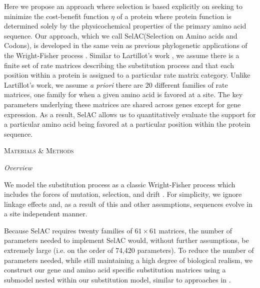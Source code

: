 \documentclass[12pt,letterpaper,fleqn]{article}
\renewcommand{\section}[1]{%
\bigskip
\begin{center}
\begin{Large}
\normalfont\scshape #1
\medskip
\end{Large}
\end{center}}
\renewcommand{\subsection}[1]{%
\bigskip
\begin{center}
\begin{large}
\normalfont\itshape #1
\end{large}
\end{center}}
\newcommand{\PC}{physicochemical\xspace}
\newcommand{\selac}{SelAC\xspace}
\begin{document}
Here we propose an approach where selection is based explicitly on seeking to minimize the cost-benefit function $\eta$ of a protein where protein function is determined solely by the \PC properties of the primary amino acid sequence.
Our approach, which we call \selac (Selection on Amino acids and Codons), is developed in the same vein as previous phylogenetic applications of the Wright-Fisher process \citep[e.g.~][]{MuseAndGaut1994,HalpernAndBruno1998,YangAndNielsen2008,RodrigueEtAl2005,KoshiAndGoldstein1997,KoshiEtAl1999,DimmicEtAl2000,ThorneEtAl2012,LartillotAndPhilippe2004,RodrigueAndLartillot2014}.
Similar to Lartillot's work \citep{LartillotAndPhilippe2004,RodrigueAndLartillot2014}, we assume there is a finite set of rate matrices describing the substitution process and that each position within a protein is assigned to a particular rate matrix category.
Unlike Lartillot's work, we assume \emph{a priori} there are 20 different families of rate matrices, one family for when a given amino acid is favored at a site.
The key parameters underlying these matrices are shared across genes except for gene expression.
As a result, \selac allows us to quantitatively evaluate the support for a particular amino acid being favored at a particular position within the protein sequence.

\section{Materials \& Methods}
\subsection{Overview}
We model the substitution process as a classic Wright-Fisher process which includes the forces of mutation, selection, and drift \citep{Fisher1930,Kimura1962,Wright1969,Iwasa1988,BergAndLassig2003,SellaAndHirsh2005,McCandlishAndStoltzfus2014}.
For simplicity, we ignore linkage effects and, as a result of this and other assumptions, sequences evolve in  a site independent manner.

Because \selac requires twenty families of $61 \times 61$ matrices, the number of parameters needed to implement \selac would, without further assumptions, be extremely large (i.e. on the order of 74,420 parameters).
To reduce the number of parameters needed, while still maintaining a high degree of biological realism, we construct our gene and amino acid specific substitution matrices using a submodel nested within our substitution model, similar to approaches in \citet{Gilchrist2007,ShahAndGilchrist2011,GilchristEtAl2015}.
\end{document}

